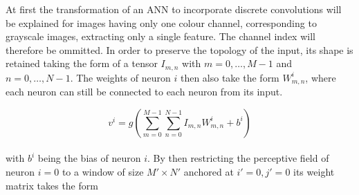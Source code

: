 
At first the transformation of an ANN to incorporate discrete convolutions will be explained for images having only one colour channel, corresponding to grayscale images, extracting only a single feature. The channel index will therefore be ommitted. In order to preserve the topology of the input, its shape is retained taking the form of a tensor $I_{m,n}$ with $m=0,\dots ,M-1$ and $n=0,\dots ,N-1$. The weights of neuron $i$ then also take the form $W^i_{m,n}$, where each neuron can still be connected to each neuron from its input.

\begin{equation}
v^i = g\left( \sum_{m=0}^{M-1} \sum_{n=0}^{N-1} I_{m,n} W_{m,n}^i + b^i \right)
\end{equation} \\
with $b^i$ being the bias of neuron $i$. By then restricting the perceptive field of neuron $i=0$ to a window of size $M'\times N'$ anchored at $i'=0,j'=0$ its weight matrix takes the form

